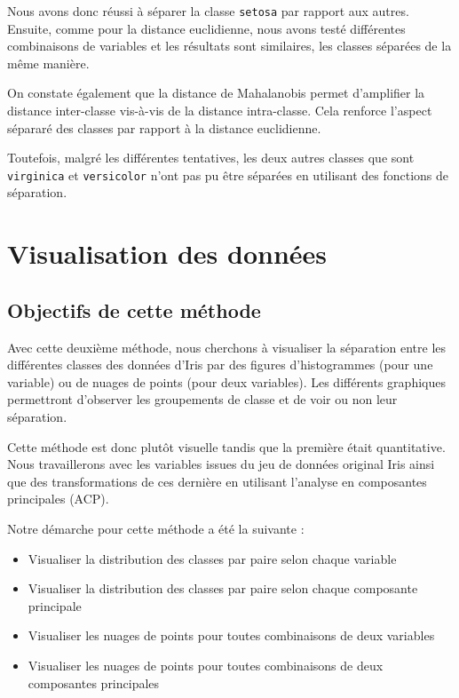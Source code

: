 \documentclass[french]{report}
\begin{document}
    Nous avons donc réussi à séparer la classe \texttt{setosa} par rapport aux autres. Ensuite, comme pour la distance euclidienne, nous avons testé différentes combinaisons de variables et les résultats sont similaires, les classes séparées de la même manière.
    
    On constate également que la distance de Mahalanobis permet d'amplifier la distance inter-classe vis-à-vis de la distance intra-classe. Cela renforce l'aspect sépararé des classes par rapport à la distance euclidienne.
    
    Toutefois, malgré les différentes tentatives, les deux autres classes que sont \texttt{virginica} et \texttt{versicolor} n'ont pas pu être séparées en utilisant des fonctions de séparation.
    
    
    \part{Visualisation des données}
    \chapter*{Objectifs de cette méthode}
    
    Avec cette deuxième méthode, nous cherchons à visualiser la séparation entre les différentes classes des données d'Iris par des figures d'histogrammes (pour une variable) ou de nuages de points (pour deux variables).
    Les différents graphiques permettront d'observer les groupements de classe et de voir ou non leur séparation.
    
    Cette méthode est donc plutôt visuelle tandis que la première était quantitative.
    Nous travaillerons avec les variables issues du jeu de données original Iris ainsi que des transformations de ces dernière en utilisant l'analyse en composantes principales (ACP).
    
    \noindent Notre démarche pour cette méthode a été la suivante :
    
    \begin{itemize}
        \item Visualiser la distribution des classes par paire selon chaque variable
        \item Visualiser la distribution des classes par paire selon chaque composante principale
        \item Visualiser les nuages de points pour toutes combinaisons de deux variables
        \item Visualiser les nuages de points pour toutes combinaisons de deux composantes principales
    \end{itemize}
    
\end{document}
